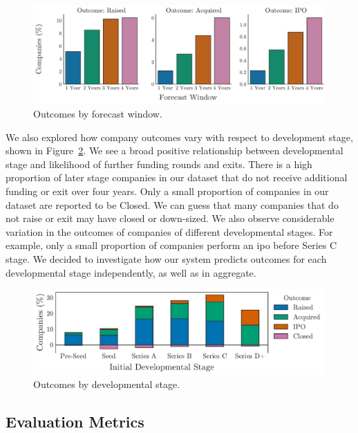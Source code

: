 \documentclass[../thesis/thesis.tex]{subfiles}
\begin{document}
\begin{figure}[!htb]
    \centering
    \includegraphics[width=\textwidth]{../figures/evaluation/outcomes_window}
    \caption[Outcomes by forecast window]{Outcomes by forecast window.}
    \label{fig:evaluation:outcome_forecast_window}
\end{figure}

We also explored how company outcomes vary with respect to development stage, shown in Figure~\ref{fig:evaluation:outcome_stage}. We see a broad positive relationship between developmental stage and likelihood of further funding rounds and exits. There is a high proportion of later stage companies in our dataset that do not receive additional funding or exit over four years. Only a small proportion of companies in our dataset are reported to be Closed. We can guess that many companies that do not raise or exit may have closed or down-sized. We also observe considerable variation in the outcomes of companies of different developmental stages. For example, only a small proportion of companies perform an \gls{ipo} before Series C stage. We decided to investigate how our system predicts outcomes for each developmental stage independently, as well as in aggregate.

\begin{figure}[!htb]
    \centering
    \includegraphics[width=\textwidth]{../figures/evaluation/outcomes_stage}
    \caption[Outcomes by developmental stage]{Outcomes by developmental stage.}
    \label{fig:evaluation:outcome_stage}
\end{figure}

\subsection{Evaluation Metrics}
\end{document}
